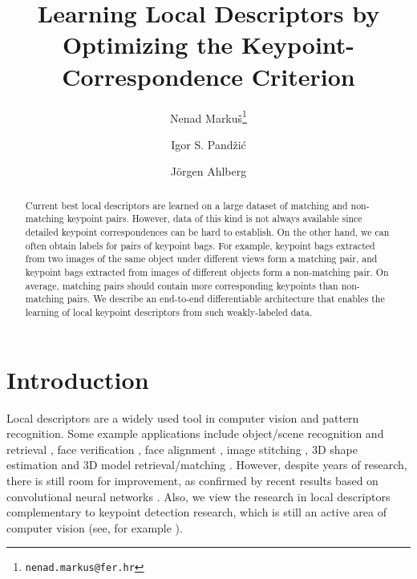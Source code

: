 \documentclass[10pt,conference,a4paper]{IEEEtran}
\begin{document}
	\title
	{
		Learning Local Descriptors by Optimizing the Keypoint-Correspondence Criterion
	}

	\author[$\dagger$]{Nenad Marku\v{s}\thanks{\texttt{nenad.markus@fer.hr}}}
	\author[$\dagger$]{Igor S. Pand\v{z}i\'{c}}
	\author[$\ddagger$]{J\"orgen Ahlberg}

	\date{}

	\maketitle

	\begin{abstract}
		Current best local descriptors are learned on a large dataset of matching and non-matching keypoint pairs.
		However, data of this kind is not always available since detailed keypoint correspondences can be hard to establish.
		On the other hand, we can often obtain labels for pairs of keypoint bags.
		For example, keypoint bags extracted from two images of the same object under different views form a matching pair, and keypoint bags extracted from images of different objects form a non-matching pair.
		On average, matching pairs should contain more corresponding keypoints than non-matching pairs.
		We describe an end-to-end differentiable architecture that enables the learning of local keypoint descriptors from such weakly-labeled data.
	\end{abstract}

	\section{Introduction}
		Local descriptors are a widely used tool in computer vision and pattern recognition.
		Some example applications include object/scene recognition and retrieval \cite{visualwords,fisherkernel,vlad}, face verification \cite{fisherfaces,localfacerec}, face alignment \cite{sdm}, image stitching \cite{recognisingpanoramas}, 3D shape estimation \cite{shapefrom2dlandmarks} and 3D model retrieval/matching \cite{hybridbow,cov3d}.
		However, despite years of research, there is still room for improvement, as confirmed by recent results based on convolutional neural networks \cite{zagoruyko,matchnet,convdesc,pnnet}.
		Also, we view the research in local descriptors complementary to keypoint detection research, which is still an active area of computer vision (see, for example \cite{tilde}).
\end{document}
